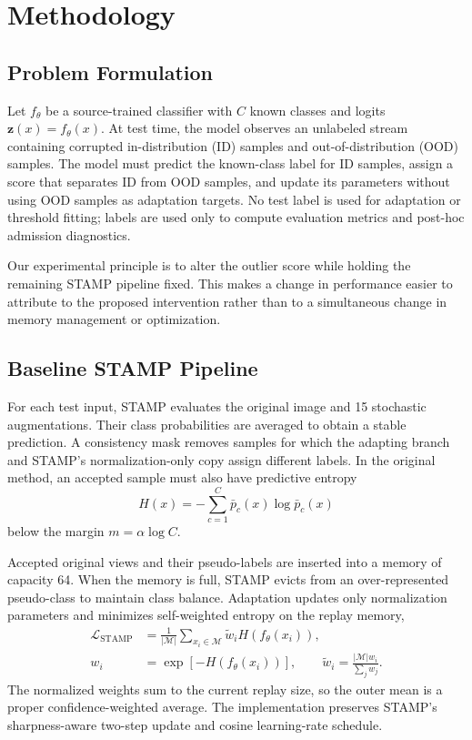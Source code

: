 \section{Methodology}

\subsection{Problem Formulation}
Let $f_{\theta}$ be a source-trained classifier with $C$ known classes and
logits $\mathbf{z}(x)=f_{\theta}(x)$. At test time, the model observes an
unlabeled stream containing corrupted in-distribution (ID) samples and
out-of-distribution (OOD) samples. The model must predict the known-class label
for ID samples, assign a score that separates ID from OOD samples, and update
its parameters without using OOD samples as adaptation targets. No test label
is used for adaptation or threshold fitting; labels are used only to compute
evaluation metrics and post-hoc admission diagnostics.

Our experimental principle is to alter the outlier score while holding the
remaining STAMP pipeline fixed. This makes a change in performance easier to
attribute to the proposed intervention rather than to a simultaneous change in
memory management or optimization.

\subsection{Baseline STAMP Pipeline}
For each test input, STAMP evaluates the original image and 15 stochastic
augmentations. Their class probabilities are averaged to obtain a stable
prediction. A consistency mask removes samples for which the adapting branch
and STAMP's normalization-only copy assign different labels. In the original
method, an accepted sample must also have predictive entropy
\begin{equation}
    H(x)=-\sum_{c=1}^{C}\bar{p}_{c}(x)\log\bar{p}_{c}(x)
\end{equation}
below the margin $m=\alpha\log C$.

Accepted original views and their pseudo-labels are inserted into a memory of
capacity 64. When the memory is full, STAMP evicts from an over-represented
pseudo-class to maintain class balance. Adaptation updates only normalization
parameters and minimizes self-weighted entropy on the replay memory,
\begin{align}
    \mathcal{L}_{\mathrm{STAMP}}
    &= \frac{1}{|\mathcal{M}|}\sum_{x_i\in\mathcal{M}}
       \widetilde{w}_i H\!\left(f_{\theta}(x_i)\right), \\
    w_i &= \exp\!\left[-H\!\left(f_{\theta}(x_i)\right)\right],
    \qquad
    \widetilde{w}_i=\frac{|\mathcal{M}|w_i}{\sum_j w_j}.
\end{align}
The normalized weights sum to the current replay size, so the outer mean is a
proper confidence-weighted average. The implementation preserves STAMP's
sharpness-aware two-step update and cosine learning-rate schedule.

